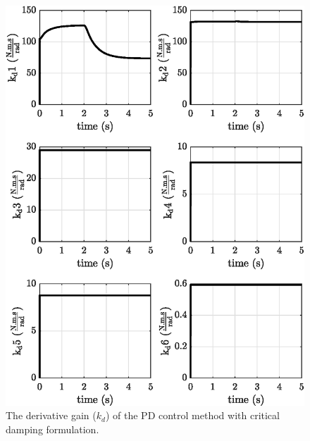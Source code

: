 \begin{figure}[H]
    \centering
    \includegraphics{images/act_1.5/kd.eps}
    \caption{The derivative gain ($k_d$) of the PD control method with critical damping formulation.}
    \label{fig:act_1.5_k_d}
\end{figure}



\newpage
